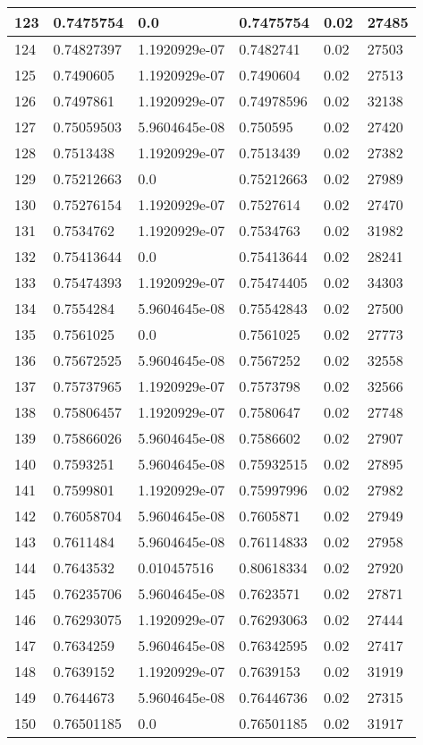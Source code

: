 \begin{longtable}{|l|l|l|l|l|l|}
123 & 0.7475754 & 0.0 & 0.7475754 & 0.02 & 27485 \\ \hline 
124 & 0.74827397 & 1.1920929e-07 & 0.7482741 & 0.02 & 27503 \\ \hline 
125 & 0.7490605 & 1.1920929e-07 & 0.7490604 & 0.02 & 27513 \\ \hline 
126 & 0.7497861 & 1.1920929e-07 & 0.74978596 & 0.02 & 32138 \\ \hline 
127 & 0.75059503 & 5.9604645e-08 & 0.750595 & 0.02 & 27420 \\ \hline 
128 & 0.7513438 & 1.1920929e-07 & 0.7513439 & 0.02 & 27382 \\ \hline 
129 & 0.75212663 & 0.0 & 0.75212663 & 0.02 & 27989 \\ \hline 
130 & 0.75276154 & 1.1920929e-07 & 0.7527614 & 0.02 & 27470 \\ \hline 
131 & 0.7534762 & 1.1920929e-07 & 0.7534763 & 0.02 & 31982 \\ \hline 
132 & 0.75413644 & 0.0 & 0.75413644 & 0.02 & 28241 \\ \hline 
133 & 0.75474393 & 1.1920929e-07 & 0.75474405 & 0.02 & 34303 \\ \hline 
134 & 0.7554284 & 5.9604645e-08 & 0.75542843 & 0.02 & 27500 \\ \hline 
135 & 0.7561025 & 0.0 & 0.7561025 & 0.02 & 27773 \\ \hline 
136 & 0.75672525 & 5.9604645e-08 & 0.7567252 & 0.02 & 32558 \\ \hline 
137 & 0.75737965 & 1.1920929e-07 & 0.7573798 & 0.02 & 32566 \\ \hline 
138 & 0.75806457 & 1.1920929e-07 & 0.7580647 & 0.02 & 27748 \\ \hline 
139 & 0.75866026 & 5.9604645e-08 & 0.7586602 & 0.02 & 27907 \\ \hline 
140 & 0.7593251 & 5.9604645e-08 & 0.75932515 & 0.02 & 27895 \\ \hline 
141 & 0.7599801 & 1.1920929e-07 & 0.75997996 & 0.02 & 27982 \\ \hline 
142 & 0.76058704 & 5.9604645e-08 & 0.7605871 & 0.02 & 27949 \\ \hline 
143 & 0.7611484 & 5.9604645e-08 & 0.76114833 & 0.02 & 27958 \\ \hline 
144 & 0.7643532 & 0.010457516 & 0.80618334 & 0.02 & 27920 \\ \hline 
145 & 0.76235706 & 5.9604645e-08 & 0.7623571 & 0.02 & 27871 \\ \hline 
146 & 0.76293075 & 1.1920929e-07 & 0.76293063 & 0.02 & 27444 \\ \hline 
147 & 0.7634259 & 5.9604645e-08 & 0.76342595 & 0.02 & 27417 \\ \hline 
148 & 0.7639152 & 1.1920929e-07 & 0.7639153 & 0.02 & 31919 \\ \hline 
149 & 0.7644673 & 5.9604645e-08 & 0.76446736 & 0.02 & 27315 \\ \hline 
150 & 0.76501185 & 0.0 & 0.76501185 & 0.02 & 31917 \\ \hline 
\end{longtable}